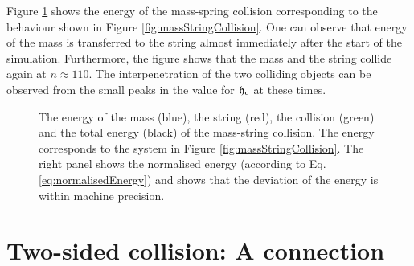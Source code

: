 Figure \ref{fig:massStringCollisionEnergy} shows the energy of the mass-spring collision corresponding to the behaviour shown in Figure \ref{fig:massStringCollision}. One can observe that energy of the mass is transferred to the string almost immediately after the start of the simulation. Furthermore, the figure shows that the mass and the string collide again at $n\approx 110$. The interpenetration of the two colliding objects can be observed from the small peaks in the value for $\mathfrak{h}_{\text{c}}$ at these times. 

\begin{figure}[h]
    \centering
      \caption{The energy of the mass (blue), the string (red), the collision (green) and the total energy (black) of the mass-string collision. The energy corresponds to the system in Figure \ref{fig:massStringCollision}. The right panel shows the normalised energy (according to Eq. \eqref{eq:normalisedEnergy}) and shows that the deviation of the energy is within machine precision. \label{fig:massStringCollisionEnergy}}
\end{figure}
\section{Two-sided collision: A connection}\label{sec:twoSidedCollision}

